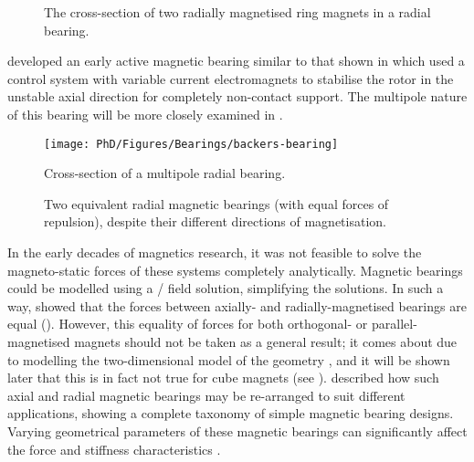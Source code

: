 \documentclass[11pt,a4paper]{memoir}
\begin{document}
\begin{figure}
  \caption[Radial bearing cross section.]{The cross-section of two radially
magnetised ring magnets in a radial bearing.}
\end{figure}

\textcite{backers1961} developed an early active magnetic bearing similar to that shown in  which used a control system with variable current electromagnets to stabilise the rotor in the unstable axial direction for completely non-contact support.
The multipole nature of this bearing will be more closely examined in .

\begin{figure}
  \begin{minipage}{0.45\linewidth}\centering
  \texttt{[image: PhD/Figures/Bearings/backers-bearing]}
  \caption[Multipole bearing cross section.]{Cross-section of a
    multipole radial bearing.}
  \end{minipage}\hfill
  \begin{minipage}{0.45\linewidth}\centering
  \caption[Two equivalent radial magnetic bearings.]{Two equivalent radial magnetic bearings
(with equal forces of repulsion), despite their different directions of
magnetisation.}
  \end{minipage}
\end{figure}

In the early decades of magnetics research, it was not feasible to solve the magneto-static forces of these systems completely analytically.
Magnetic bearings could be modelled using a \twoD/ field solution, simplifying the solutions.
In such a way, \textcite{yonnet1978} showed that the forces between axially- and radially-magnetised bearings are equal ().
However, this equality of forces for both orthogonal- or parallel-magnetised magnets should not be taken as a general result; it comes about due to modelling the two-dimensional model of the geometry \cite{anderson1987-ietm}, and it will be shown later that this is in fact not true for cube magnets (see ).
\textcite{yonnet1981} described how such axial and radial magnetic bearings may be re-arranged to suit different applications, showing a complete taxonomy of simple magnetic bearing designs.
Varying geometrical parameters of these magnetic bearings can significantly affect the force and stiffness characteristics \cite{bassani2006-trib-int}.
\end{document}
